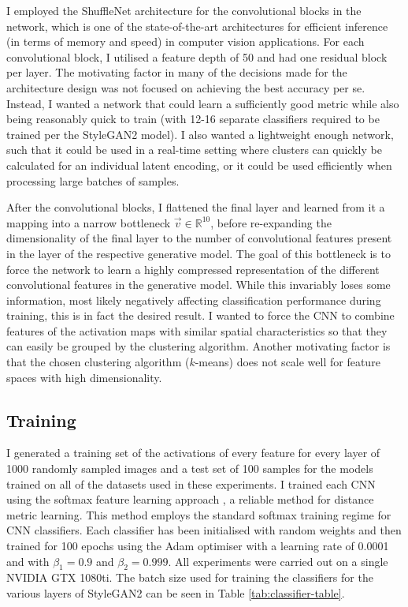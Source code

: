 I employed the ShuffleNet architecture \citep{zhang2018shufflenet} for the convolutional blocks in the network, which is one of the state-of-the-art architectures for efficient inference (in terms of memory and speed) in computer vision applications. 
For each convolutional block, I utilised a feature depth of 50 and had one residual block per layer. 
The motivating factor in many of the decisions made for the architecture design was not focused on achieving the best accuracy per se. 
Instead, I wanted a network that could learn a sufficiently good metric while also being reasonably quick to train (with 12-16 separate classifiers required to be trained per the StyleGAN2 model). 
I also wanted a lightweight enough network, such that it could be used in a real-time setting where clusters can quickly be calculated for an individual latent encoding, or it could be used efficiently when processing large batches of samples.

After the convolutional blocks, I flattened the final layer and learned from it a mapping into a narrow bottleneck $\vec{v} \in \mathbb{R}^{10}$, before re-expanding the dimensionality of the final layer to the number of convolutional features present in the layer of the respective generative model. 
The goal of this bottleneck is to force the network to learn a highly compressed representation of the different convolutional features in the generative model. 
While this invariably loses some information, most likely negatively affecting classification performance during training, this is in fact the desired result. 
I wanted to force the CNN to combine features of the activation maps with similar spatial characteristics so that they can easily be grouped by the clustering algorithm. 
Another motivating factor is that the chosen clustering algorithm ($k$-means) does not scale well for feature spaces with high dimensionality.

\subsection{Training}

I generated a training set of the activations of every feature for every layer of 1000 randomly sampled images and a test set of 100 samples for the models trained on all of the datasets used in these experiments. 
I trained each CNN using the softmax feature learning approach \citep{dosovitskiy2014discriminative}, a reliable method for distance metric learning. This method employs the standard softmax training regime \citep{bridle1990probabilistic} for CNN classifiers. 
Each classifier has been initialised with random weights and then trained for 100 epochs using the Adam optimiser \citep{kingma2015adam} with a learning rate of 0.0001 and with $\beta_1 = 0.9$ and $\beta_2 = 0.999$. 
All experiments were carried out on a single NVIDIA GTX 1080ti. The batch size used for training the classifiers for the various layers of StyleGAN2 can be seen in Table \ref{tab:classifier-table}. 

